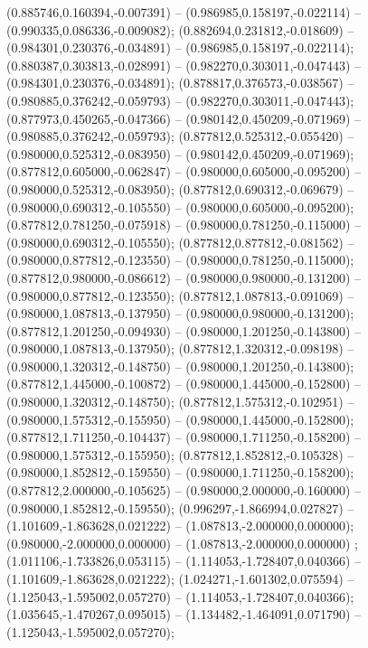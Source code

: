 (0.885746,0.160394,-0.007391) -- (0.986985,0.158197,-0.022114) -- (0.990335,0.086336,-0.009082);
 (0.882694,0.231812,-0.018609) -- (0.984301,0.230376,-0.034891) -- (0.986985,0.158197,-0.022114);
 (0.880387,0.303813,-0.028991) -- (0.982270,0.303011,-0.047443) -- (0.984301,0.230376,-0.034891);
 (0.878817,0.376573,-0.038567) -- (0.980885,0.376242,-0.059793) -- (0.982270,0.303011,-0.047443);
 (0.877973,0.450265,-0.047366) -- (0.980142,0.450209,-0.071969) -- (0.980885,0.376242,-0.059793);
 (0.877812,0.525312,-0.055420) -- (0.980000,0.525312,-0.083950) -- (0.980142,0.450209,-0.071969);
 (0.877812,0.605000,-0.062847) -- (0.980000,0.605000,-0.095200) -- (0.980000,0.525312,-0.083950);
 (0.877812,0.690312,-0.069679) -- (0.980000,0.690312,-0.105550) -- (0.980000,0.605000,-0.095200);
 (0.877812,0.781250,-0.075918) -- (0.980000,0.781250,-0.115000) -- (0.980000,0.690312,-0.105550);
 (0.877812,0.877812,-0.081562) -- (0.980000,0.877812,-0.123550) -- (0.980000,0.781250,-0.115000);
 (0.877812,0.980000,-0.086612) -- (0.980000,0.980000,-0.131200) -- (0.980000,0.877812,-0.123550);
 (0.877812,1.087813,-0.091069) -- (0.980000,1.087813,-0.137950) -- (0.980000,0.980000,-0.131200);
 (0.877812,1.201250,-0.094930) -- (0.980000,1.201250,-0.143800) -- (0.980000,1.087813,-0.137950);
 (0.877812,1.320312,-0.098198) -- (0.980000,1.320312,-0.148750) -- (0.980000,1.201250,-0.143800);
 (0.877812,1.445000,-0.100872) -- (0.980000,1.445000,-0.152800) -- (0.980000,1.320312,-0.148750);
 (0.877812,1.575312,-0.102951) -- (0.980000,1.575312,-0.155950) -- (0.980000,1.445000,-0.152800);
 (0.877812,1.711250,-0.104437) -- (0.980000,1.711250,-0.158200) -- (0.980000,1.575312,-0.155950);
 (0.877812,1.852812,-0.105328) -- (0.980000,1.852812,-0.159550) -- (0.980000,1.711250,-0.158200);
 (0.877812,2.000000,-0.105625) -- (0.980000,2.000000,-0.160000) -- (0.980000,1.852812,-0.159550);
 (0.996297,-1.866994,0.027827) -- (1.101609,-1.863628,0.021222) -- (1.087813,-2.000000,0.000000);
 (0.980000,-2.000000,0.000000) -- (1.087813,-2.000000,0.000000) ;
 (1.011106,-1.733826,0.053115) -- (1.114053,-1.728407,0.040366) -- (1.101609,-1.863628,0.021222);
 (1.024271,-1.601302,0.075594) -- (1.125043,-1.595002,0.057270) -- (1.114053,-1.728407,0.040366);
 (1.035645,-1.470267,0.095015) -- (1.134482,-1.464091,0.071790) -- (1.125043,-1.595002,0.057270);
